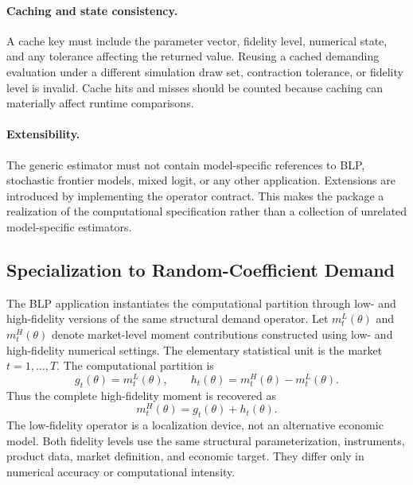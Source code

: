 \paragraph{Caching and state consistency.}
A cache key must include the parameter vector, fidelity level, numerical state,
and any tolerance affecting the returned value. Reusing a cached demanding
evaluation under a different simulation draw set, contraction tolerance, or
fidelity level is invalid. Cache hits and misses should be counted because
caching can materially affect runtime comparisons.

\paragraph{Extensibility.}
The generic estimator must not contain model-specific references to BLP,
stochastic frontier models, mixed logit, or any other application. Extensions
are introduced by implementing the operator contract. This makes the package a
realization of the computational specification rather than a collection of
unrelated model-specific estimators.

\subsection{Specialization to Random-Coefficient Demand}
\label{app:blp_specialization}

The BLP application instantiates the computational partition through
low- and high-fidelity versions of the same structural demand operator. Let
$m_t^{L}(\theta)$ and $m_t^{H}(\theta)$ denote market-level moment contributions
constructed using low- and high-fidelity numerical settings. The elementary
statistical unit is the market $t=1,\ldots,T$. The computational partition is
\begin{equation}
 g_t(\theta)
 =
 m_t^{L}(\theta),
 \qquad
 h_t(\theta)
 =
 m_t^{H}(\theta)-m_t^{L}(\theta).
 \label{eq:app_blp_partition}
\end{equation}
Thus the complete high-fidelity moment is recovered as
\begin{equation}
 m_t^{H}(\theta)
 =
 g_t(\theta)+h_t(\theta).
 \label{eq:app_blp_recovery}
\end{equation}
The low-fidelity operator is a localization device, not an alternative economic
model. Both fidelity levels use the same structural parameterization,
instruments, product data, market definition, and economic target. They differ
only in numerical accuracy or computational intensity.

